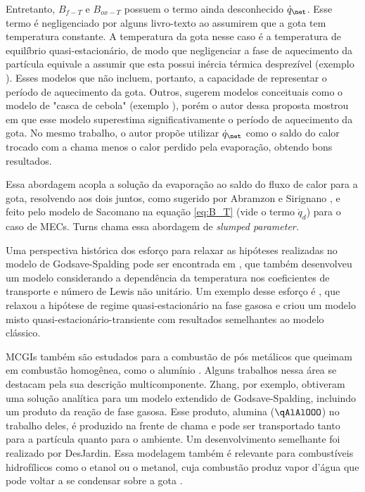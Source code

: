 Entretanto, $B_{f-T}$ e $B_{ox-T}$ possuem o termo ainda desconhecido $\dot q_\net$.
Esse termo é negligenciado por alguns livro-texto \cite{Glassman2008,Williams1985} ao assumirem que a gota tem temperatura constante. 
A temperatura da gota nesse caso é a temperatura de equilíbrio quasi-estacionário, de modo que negligenciar a fase de aquecimento da partícula equivale a assumir que esta possui inércia térmica desprezível (exemplo \cite{Turns2000,Glassman2008}). 
Esses modelos que não incluem, portanto, a capacidade de representar o  período de aquecimento da gota.
Outros, sugerem modelos conceituais como o modelo de "casca de cebola" (exemplo \cite[p. 385]{Turns2000}), porém o autor dessa proposta mostrou em \cite{HenningsJ2024MT} que esse modelo superestima significativamente o período de aquecimento da gota.
No mesmo trabalho, o autor propõe utilizar $\dot q_\net$ como o saldo do calor trocado com a chama menos o calor perdido pela evaporação, obtendo bons resultados.

Essa abordagem acopla a solução da evaporação ao saldo do fluxo de calor para a gota, resolvendo aos dois juntos, como sugerido por Abramzon e Sirignano \cite{Sirignano1989}, e feito pelo modelo de Sacomano\etal \cite{SacomanoF2022IJHMT} na equação \eqref{eq:B_T} (vide o termo $\dot q_d$) para o caso de MECs.
Turns \cite{Turns2000} chama essa abordagem de \emph{slumped parameter.}

Uma perspectiva histórica dos esforço para relaxar as hipóteses realizadas no modelo de Godsave-Spalding pode ser encontrada em \cite{FachiniF1999}, que também desenvolveu um modelo considerando a dependência da temperatura nos coeficientes de transporte e número de Lewis não unitário.
Um exemplo desse esforço é \cite{UlzamaS2007}, que relaxou a hipótese de regime quasi-estacionário na fase gasosa e criou um modelo misto quasi-estacionário-transiente com resultados semelhantes ao modelo clássico.

MCGIs também são estudados para a combustão de pós metálicos que queimam em combustão homogênea, como o alumínio \cite[p. 7]{Bergthorson2015}.
Alguns trabalhos nessa área se destacam pela sua descrição multicomponente. 
Zhang\etal \cite{Zhang2022_Coflow,Zhang2022_Counterflow}, por exemplo, obtiveram uma solução analítica para um modelo extendido de Godsave-Spalding, incluindo um produto da reação de fase gasosa.
Esse produto, alumina ($\qAlAlOOO$) no trabalho deles, é produzido na frente de chama e pode ser transportado tanto para a partícula quanto para o ambiente.
Um desenvolvimento semelhante foi realizado por DesJardin\etal \cite{DesJardin2005}.
Essa modelagem também é relevante para combustíveis hidrofílicos como o etanol ou o metanol, cuja combustão produz vapor d'água que pode voltar a se condensar sobre a  gota \cite{SacomanoF2024CF,SacomanoF2025CF}. 

